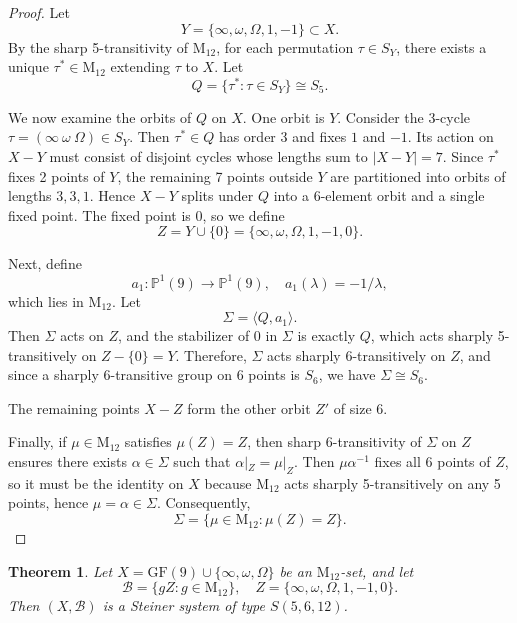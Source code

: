 \documentclass[12pt,a4paper,openany]{book}
\newtheorem{theorem}{Theorem}[section]
\newcommand{\GF}{\mathrm{GF}}
\newcommand{\PP}{\mathbb{P}}
\begin{document}
\begin{proof}
Let 
\[
Y = \{\infty, \omega, \Omega, 1, -1\} \subset X.
\] 
By the sharp 5-transitivity of $\mathrm{M}_{12}$, for each permutation $\tau \in S_Y$, there exists a unique $\tau^* \in \mathrm{M}_{12}$ extending $\tau$ to $X$. Let 
\[
Q = \{\tau^* : \tau \in S_Y\} \cong S_5.
\]

We now examine the orbits of $Q$ on $X$. One orbit is $Y$. Consider the 3-cycle $\tau = (\infty\ \omega\ \Omega) \in S_Y$. Then $\tau^* \in Q$ has order 3 and fixes $1$ and $-1$. Its action on $X - Y$ must consist of disjoint cycles whose lengths sum to $|X - Y| = 7$. Since $\tau^*$ fixes 2 points of $Y$, the remaining 7 points outside $Y$ are partitioned into orbits of lengths $3,3,1$. Hence $X - Y$ splits under $Q$ into a 6-element orbit and a single fixed point. The fixed point is $0$, so we define 
\[
Z = Y \cup \{0\} = \{\infty, \omega, \Omega, 1, -1, 0\}.
\]

Next, define 
\[
a_1: \PP^1(9) \to \PP^1(9), \quad a_1(\lambda) = -1/\lambda,
\] 
which lies in $\mathrm{M}_{12}$. Let 
\[
\Sigma = \langle Q, a_1 \rangle.
\]
Then $\Sigma$ acts on $Z$, and the stabilizer of $0$ in $\Sigma$ is exactly $Q$, which acts sharply 5-transitively on $Z - \{0\} = Y$. Therefore, $\Sigma$ acts sharply 6-transitively on $Z$, and since a sharply 6-transitive group on 6 points is $S_6$, we have $\Sigma \cong S_6$. 

The remaining points $X - Z$ form the other orbit $Z'$ of size 6. 

Finally, if $\mu \in \mathrm{M}_{12}$ satisfies $\mu(Z) = Z$, then sharp 6-transitivity of $\Sigma$ on $Z$ ensures there exists $\alpha \in \Sigma$ such that $\alpha|_Z = \mu|_Z$. Then $\mu \alpha^{-1}$ fixes all 6 points of $Z$, so it must be the identity on $X$ because $\mathrm{M}_{12}$ acts sharply 5-transitively on any 5 points, hence $\mu = \alpha \in \Sigma$. Consequently,
\[
\Sigma = \{\mu \in \mathrm{M}_{12} : \mu(Z) = Z\}.
\]
\end{proof}


\begin{theorem}\label{thm:S56}
Let $X = \GF(9) \cup \{\infty, \omega, \Omega\}$ be an $\mathrm{M}_{12}$-set, and let 
\[
\mathscr{B} = \{gZ : g \in \mathrm{M}_{12}\}, \quad Z = \{\infty, \omega, \Omega, 1, -1, 0\}.
\]
Then $(X, \mathscr{B})$ is a Steiner system of type $S(5, 6, 12)$.
\end{theorem}
\end{document}
